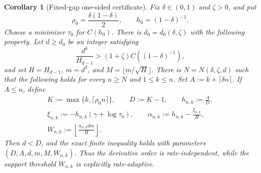\documentclass[11pt,letterpaper]{article}
\newtheorem{corollary}[corollary]{Corollary}
\theoremstyle{definition}
\begin{document}
\begin{corollary}[Fixed-gap one-sided certificate]
\label{cor:boundary-uniform-certificate}
Fix $\delta\in(0,1)$ and $\zeta>0$, and put
\[
  \rho_0=\frac{\delta(1-\delta)}2,
  \qquad
  h_0=(1-\delta)^{-1}.
\]
Choose a minimizer $\tau_0$ for $C(h_0)$. There is
$d_0=d_0(\delta,\zeta)$ with the following property. Let
$d\geq d_0$ be an integer satisfying
\begin{equation}
  \frac{d^\delta}{H_{d-1}}
  >(1+\zeta)C((1-\delta)^{-1}),
  \label{eq:boundary-uniform-condition}
\end{equation}
and set $H=H_{d-1}$, $m=d^3$, and $M=\lfloor m/\sqrt H\rfloor$. There is
$N=N(\delta,\zeta,d)$ such that the following holds for every $n\geq N$
and $1\leq k\leq n$. Set $A:=k+\lceil\delta n\rceil$. If $A\leq n$,
define
\begin{gather*}
  K:=\max\{k,\lceil\rho_0n\rceil\},
  \qquad D:=K-1,
  \qquad h_{n,k}:=\frac AD,\\
  \xi_{n,k}:=-h_{n,k}(\gamma+\log\tau_0),
  \qquad
  \alpha_{n,k}:=h_{n,k}-\frac{\xi_{n,k}}H,\\
  W_{n,k}:=
  \left\lfloor\frac{\alpha_{n,k}dm}{H}\right\rfloor.
\end{gather*}
Then $d<D$, and the exact finite inequality
 holds with parameters
$(D,A,d,m,M,W_{n,k})$. Thus the derivative order is rate-independent,
while the support threshold $W_{n,k}$ is explicitly rate-adaptive.
\end{corollary}
\end{document}
